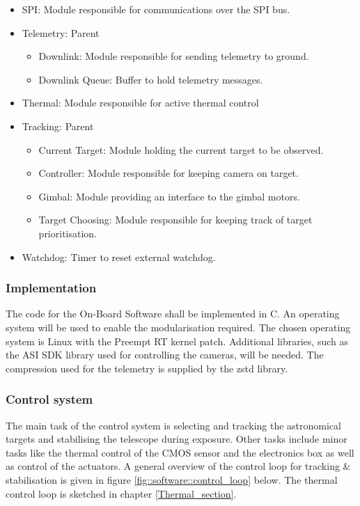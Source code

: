 \begin{itemize}
	\item SPI: Module responsible for communications over the SPI bus.

	\item Telemetry: Parent
		\begin{itemize}
			\item Downlink: Module responsible for sending telemetry to ground.
			\item Downlink Queue: Buffer to hold telemetry messages.
		\end{itemize}

	\item Thermal: Module responsible for active thermal control

	\item Tracking: Parent
		\begin{itemize}
			\item Current Target: Module holding the current target to be observed.
			\item Controller: Module responsible for keeping camera on target.
			\item Gimbal: Module providing an interface to the gimbal motors.
			\item Target Choosing: Module responsible for keeping track of target prioritisation.
		\end{itemize}

	\item Watchdog: Timer to reset external watchdog.

\end{itemize}

\subsubsection{Implementation}

The code for the On-Board Software shall be implemented in C. An operating system will be used to enable the modularisation required. The chosen operating system is Linux with the Preempt RT kernel patch. Additional libraries, such as the ASI SDK library used for controlling the cameras, will be needed. The compression used for the telemetry is supplied by the zstd library.



\subsubsection{Control system}
The main task of the control system is selecting and tracking the astronomical targets and stabilising the telescope during exposure. Other tasks include minor tasks like the thermal control of the CMOS sensor and the electronics box as well as control of the actuators. A general overview of the control loop for tracking \& stabilisation is given in figure  \mbox{\ref{fig::software::control_loop}} below. The thermal control loop is sketched in chapter \mbox{\ref{Thermal_section}}.

